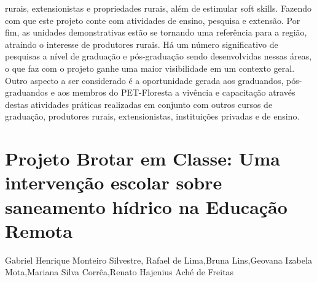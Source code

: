 rurais, extensionistas e propriedades rurais, além de estimular soft skills. Fazendo com que este
projeto conte com atividades de ensino, pesquisa e extensão. Por fim, as unidades demonstrativas
estão se tornando uma referência para a região, atraindo o interesse de produtores rurais. Há um
número significativo de pesquisas a nível de graduação e pós-graduação sendo desenvolvidas
nessas áreas, o que faz com o projeto ganhe uma maior visibilidade em um contexto geral. Outro
aspecto a ser considerado é a oportunidade gerada aos graduandos, pós-graduandos e aos
membros do PET-Floresta a vivência e capacitação através destas atividades práticas realizadas
em conjunto com outros cursos de graduação, produtores rurais, extensionistas, instituições
privadas e de ensino.



\section{Projeto Brotar em Classe: Uma intervenção escolar sobre saneamento hídrico na Educação Remota   }

Gabriel Henrique Monteiro Silvestre, Rafael de Lima,Bruna Lins,Geovana Izabela Mota,Mariana Silva Corrêa,Renato  Hajenius Aché de Freitas

